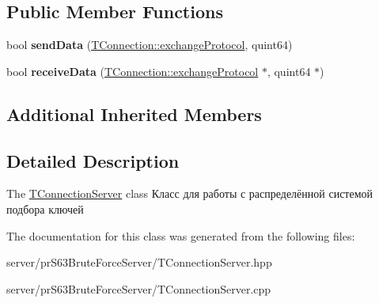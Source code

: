 \subsection*{Public Member Functions}
\begin{DoxyCompactItemize}
\item 
\mbox{\label{classconnection_1_1_t_connection_server_a481b658bc12f7bb0b5fee3ccef2937ff}} 
bool {\bfseries send\+Data} (\hyperlink{classconnection_1_1_t_connection_a3550181cb2fa72eccfa55d23f45cea34}{T\+Connection\+::exchange\+Protocol}, quint64)
\item 
\mbox{\label{classconnection_1_1_t_connection_server_a40b7cdfa826bf501fdb165e965511736}} 
bool {\bfseries receive\+Data} (\hyperlink{classconnection_1_1_t_connection_a3550181cb2fa72eccfa55d23f45cea34}{T\+Connection\+::exchange\+Protocol} $\ast$, quint64 $\ast$)
\end{DoxyCompactItemize}
\subsection*{Additional Inherited Members}


\subsection{Detailed Description}
The \hyperlink{classconnection_1_1_t_connection_server}{T\+Connection\+Server} class Класс для работы с распределённой системой подбора ключей 

The documentation for this class was generated from the following files\+:\begin{DoxyCompactItemize}
\item 
server/pr\+S63\+Brute\+Force\+Server/T\+Connection\+Server.\+hpp\item 
server/pr\+S63\+Brute\+Force\+Server/T\+Connection\+Server.\+cpp\end{DoxyCompactItemize}
